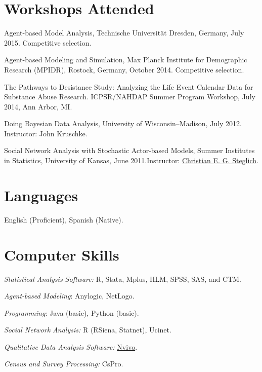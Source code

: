 \documentclass[10pt,letterpaper]{article}
\renewenvironment{itemize}{
  \begin{list}{}{
    \setlength{\leftmargin}{1.5em}
    \setlength{\itemsep}{0.25em}
    \setlength{\parskip}{0pt}
    \setlength{\parsep}{0.25em}
  }
}{
  \end{list}
}
\begin{document}
\section*{Workshops Attended}

\begin{itemize}
\item Agent-based Model Analysis, Technische Universität Dresden, Germany, July 2015. Competitive selection.
\item Agent-based Modeling and Simulation, Max Planck Institute for Demographic Research (MPIDR), Rostock, Germany, October 2014. Competitive selection.
\item The Pathways to Desistance Study: Analyzing the Life Event Calendar Data for Substance Abuse Research. ICPSR/NAHDAP Summer Program Workshop, July 2014, Ann Arbor, MI.
\item Doing Bayesian Data Analysis, University of Wisconsin--Madison, July 2012. Instructor: John Kruschke.
\item Social Network Analysis with Stochastic Actor-based Models, Summer Institutes in Statistics,  University of Kansas, June 2011.Instructor: \href{http://www.ppsw.rug.nl/~steglich/sites/index.htm}{Christian E. G. Steglich}.

 \end{itemize}

\section*{Languages}

\begin{itemize}
\item English (Proficient), Spanish (Native).
\end{itemize}

\section*{Computer Skills}

\begin{itemize}
\item \textit{Statistical Analysis Software:} R, Stata, Mplus, HLM, SPSS, SAS, and CTM.
\item \textit{Agent-based Modeling}: Anylogic, NetLogo.
\item \textit{Programming}: Java (basic), Python (basic).
\item \textit{Social Network Analysis:} R (RSiena, Statnet), Ucinet.
\item \textit{Qualitative Data Analysis Software:} \href{http://www.qsrinternational.com/}{Nvivo}.
\item \textit{Census and Survey Processing:} CsPro.
\end{itemize}
\end{document}
